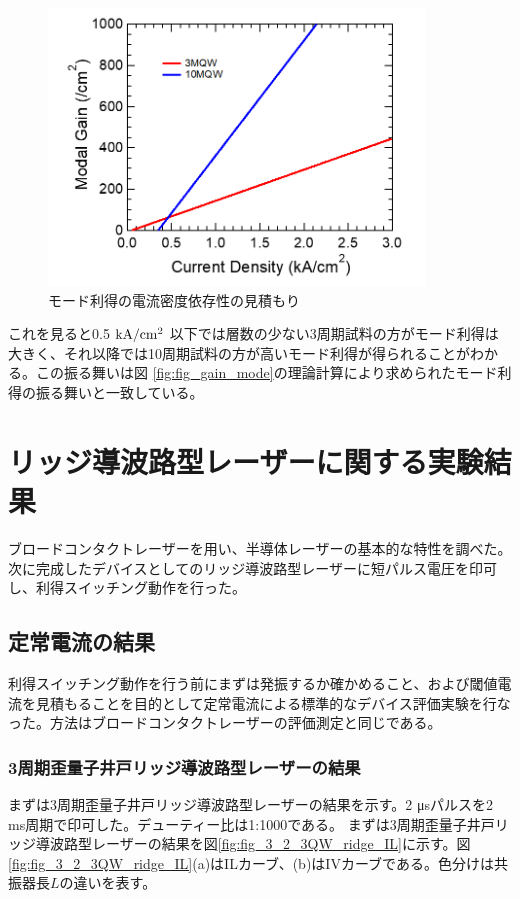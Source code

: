 {\begin{figure}[t]
	\centering
	\includegraphics[width=10cm]{figure/fig_3_1_broadcontact_modal_gain.png}
	\caption{モード利得の電流密度依存性の見積もり}
	\label{fig:fig_3_1_broadcontact_modal_gain}
\end{figure}
これを見ると0.5$ \ \rm{kA/cm^2}$ 以下では層数の少ない3周期試料の方がモード利得は大きく、それ以降では10周期試料の方が高いモード利得が得られることがわかる。この振る舞いは図	\ref{fig:fig_gain_mode}の理論計算により求められたモード利得の振る舞いと一致している。
\clearpage
\section{リッジ導波路型レーザーに関する実験結果}%
ブロードコンタクトレーザーを用い、半導体レーザーの基本的な特性を調べた。次に完成したデバイスとしてのリッジ導波路型レーザーに短パルス電圧を印可し、利得スイッチング動作を行った。
\subsection{定常電流の結果}

利得スイッチング動作を行う前にまずは発振するか確かめること、および閾値電流を見積もることを目的として定常電流による標準的なデバイス評価実験を行なった。方法はブロードコンタクトレーザーの評価測定と同じである。
\subsubsection{3周期歪量子井戸リッジ導波路型レーザーの結果}
まずは3周期歪量子井戸リッジ導波路型レーザーの結果を示す。2 \si{\micro s}パルスを2 ms周期で印可した。デューティー比は1:1000である。
まずは3周期歪量子井戸リッジ導波路型レーザーの結果を図\ref{fig:fig_3_2_3QW_ridge_IL}に示す。図\ref{fig:fig_3_2_3QW_ridge_IL}(a)はILカーブ、(b)はIVカーブである。色分けは共振器長$L$の違いを表す。

}
